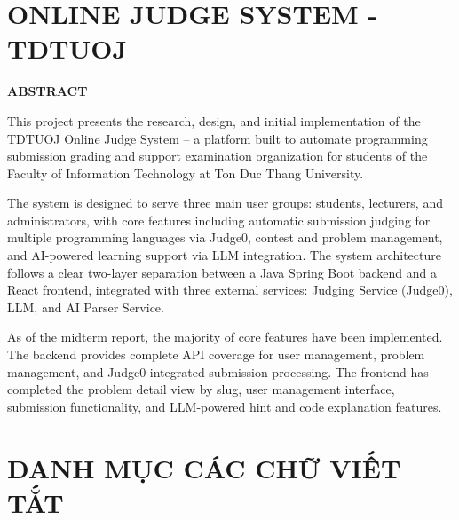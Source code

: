 \documentclass[12pt, a4paper]{report}
\newcommand{\thesistitleen}{ONLINE JUDGE SYSTEM - TDTUOJ}
\begin{document}
\newpage

\chapter*{\thesistitleen}
\begin{center}\textbf{ABSTRACT}\end{center}

\noindent This project presents the research, design, and initial implementation of the TDTUOJ Online Judge System -- a platform built to automate programming submission grading and support examination organization for students of the Faculty of Information Technology at Ton Duc Thang University.

\noindent The system is designed to serve three main user groups: students, lecturers, and administrators, with core features including automatic submission judging for multiple programming languages via Judge0, contest and problem management, and AI-powered learning support via \ac{LLM} integration. The system architecture follows a clear two-layer separation between a Java Spring Boot backend and a React frontend, integrated with three external services: Judging Service (Judge0), \ac{LLM}, and AI Parser Service.

\noindent As of the midterm report, the majority of core features have been implemented. The backend provides complete \ac{API} coverage for user management, problem management, and Judge0-integrated submission processing. The frontend has completed the problem detail view by slug, user management interface, submission functionality, and \ac{LLM}-powered hint and code explanation features.

\newpage

\setcounter{page}{1}

\tableofcontents
\newpage

\listoffigures
{}
\newpage

\listoftables
{}
\newpage

\chapter*{DANH MỤC CÁC CHỮ VIẾT TẮT}
\end{document}
